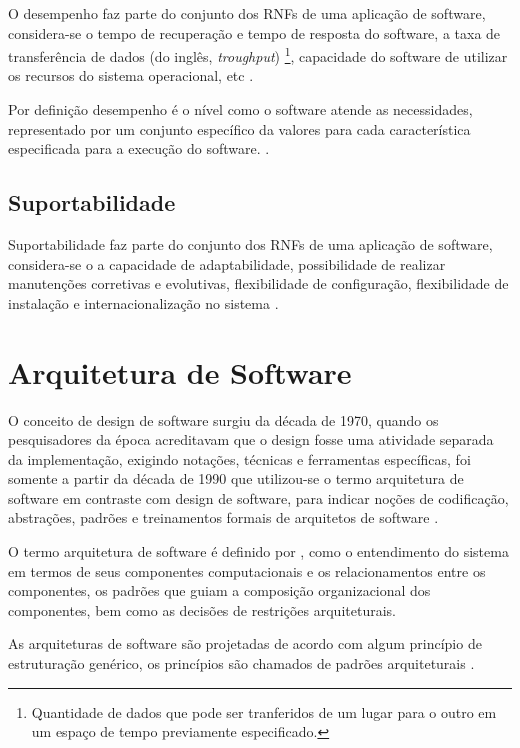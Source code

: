 O desempenho faz parte do conjunto dos RNFs de uma aplicação de software, considera-se o tempo de recuperação e tempo de resposta do software, a taxa de transferência de dados (do inglês, \textit{troughput}) \footnote[1]{Quantidade de dados que pode ser tranferidos de um lugar para o outro em um espaço de tempo previamente especificado.}, capacidade do software de utilizar os recursos do sistema operacional, etc \cite{cintra2006implementaccao}.

Por definição desempenho é o nível como o software atende as necessidades, representado por um conjunto específico da valores para cada característica especificada para a execução do software. \cite{qualidadeDeProdutoNBR}.  

\subsection{Suportabilidade}
\label{subsec:suportabilidade}

Suportabilidade faz parte do conjunto dos RNFs de uma aplicação de software, considera-se o a capacidade de adaptabilidade, possibilidade de realizar manutenções corretivas e evolutivas, flexibilidade de configuração, flexibilidade de instalação e internacionalização no sistema \cite{cintra2006implementaccao}.

\section{Arquitetura de Software}
\label{sec:arquitetura}

O conceito de design de software surgiu da década de 1970, quando os pesquisadores da época acreditavam que o design fosse uma atividade separada da implementação, exigindo notações, técnicas e ferramentas específicas, foi somente a partir da década de 1990 que utilizou-se o termo arquitetura de software em contraste com design de software, para indicar noções de codificação, abstrações, padrões e treinamentos formais de arquitetos de software \cite{perry1992foundations}.

O termo arquitetura de software é definido por \cite{shaw1996software}, como o entendimento do sistema em termos de seus componentes computacionais e os relacionamentos entre os componentes, os padrões que guiam a composição organizacional dos componentes, bem como as decisões de restrições arquiteturais. 

As arquiteturas de software são projetadas de acordo com algum princípio de estruturação genérico, os princípios são chamados de padrões arquiteturais \cite{buschmann1996system}. 

